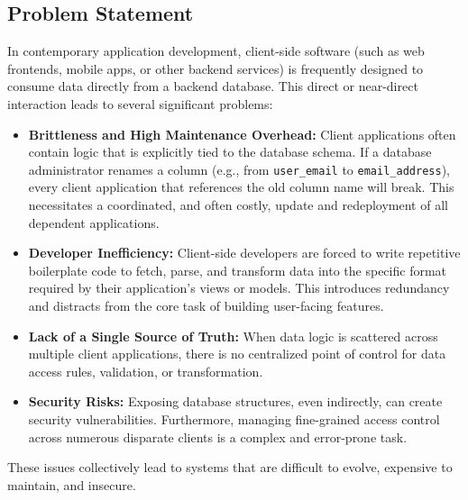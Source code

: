 \documentclass[12pt, a4paper]{report}
\begin{document}
\subsection{Problem Statement}
In contemporary application development, client-side software (such as web frontends, mobile apps, or other backend services) is frequently designed to consume data directly from a backend database. This direct or near-direct interaction leads to several significant problems:
\begin{itemize}
    \item \textbf{Brittleness and High Maintenance Overhead:} Client applications often contain logic that is explicitly tied to the database schema. If a database administrator renames a column (e.g., from \lstinline!user_email! to \lstinline!email_address!), every client application that references the old column name will break. This necessitates a coordinated, and often costly, update and redeployment of all dependent applications.
    \item \textbf{Developer Inefficiency:} Client-side developers are forced to write repetitive boilerplate code to fetch, parse, and transform data into the specific format required by their application's views or models. This introduces redundancy and distracts from the core task of building user-facing features.
    \item \textbf{Lack of a Single Source of Truth:} When data logic is scattered across multiple client applications, there is no centralized point of control for data access rules, validation, or transformation. 
    \item \textbf{Security Risks:} Exposing database structures, even indirectly, can create security vulnerabilities. Furthermore, managing fine-grained access control across numerous disparate clients is a complex and error-prone task.
\end{itemize}
These issues collectively lead to systems that are difficult to evolve, expensive to maintain, and insecure.
\end{document}
